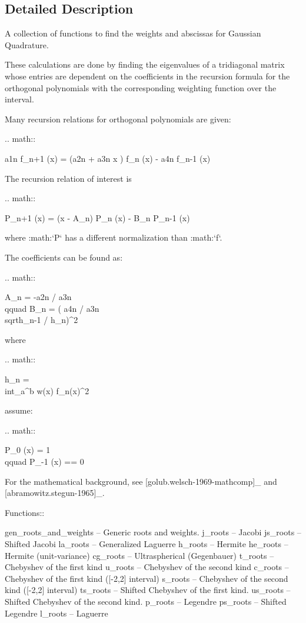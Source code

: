 \subsection{Detailed Description}
\begin{DoxyVerb}A collection of functions to find the weights and abscissas for
Gaussian Quadrature.

These calculations are done by finding the eigenvalues of a
tridiagonal matrix whose entries are dependent on the coefficients
in the recursion formula for the orthogonal polynomials with the
corresponding weighting function over the interval.

Many recursion relations for orthogonal polynomials are given:

.. math::

a1n f_{n+1} (x) = (a2n + a3n x ) f_n (x) - a4n f_{n-1} (x)

The recursion relation of interest is

.. math::

P_{n+1} (x) = (x - A_n) P_n (x) - B_n P_{n-1} (x)

where :math:`P` has a different normalization than :math:`f`.

The coefficients can be found as:

.. math::

A_n = -a2n / a3n
\\qquad
B_n = ( a4n / a3n \\sqrt{h_n-1 / h_n})^2

where

.. math::

h_n = \\int_a^b w(x) f_n(x)^2

assume:

.. math::

P_0 (x) = 1
\\qquad
P_{-1} (x) == 0

For the mathematical background, see [golub.welsch-1969-mathcomp]_ and
[abramowitz.stegun-1965]_.

Functions::

  gen_roots_and_weights  -- Generic roots and weights.
  j_roots                -- Jacobi
  js_roots               -- Shifted Jacobi
  la_roots               -- Generalized Laguerre
  h_roots                -- Hermite
  he_roots               -- Hermite (unit-variance)
  cg_roots               -- Ultraspherical (Gegenbauer)
  t_roots                -- Chebyshev of the first kind
  u_roots                -- Chebyshev of the second kind
  c_roots                -- Chebyshev of the first kind ([-2,2] interval)
  s_roots                -- Chebyshev of the second kind ([-2,2] interval)
  ts_roots               -- Shifted Chebyshev of the first kind.
  us_roots               -- Shifted Chebyshev of the second kind.
  p_roots                -- Legendre
  ps_roots               -- Shifted Legendre
  l_roots                -- Laguerre



\end{DoxyVerb}
